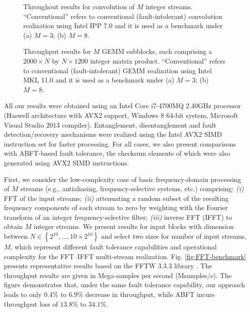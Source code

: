 \documentclass[twocolumn,english,onecolumn]{IEEEtran}
\theoremstyle{plain}
\theoremstyle{plain}
\begin{document}
\begin{figure*}[tbh]
\begin{centering}
\par\end{centering}

\protect\caption{Throughout results for convolution of $M$ integer streams. ``Conventional''
refers to conventional (fault-intolerant) convolution realization
using Intel IPP 7.0 and it is used as a benchmark under (a) $M=3$;
(b) $M=8$. \label{fig:CONV-benchmark}}
\end{figure*}


\begin{figure*}[tbh]
\begin{centering}
\par\end{centering}

\protect\caption{Throughput results for $M$ GEMM subblocks, each comprising a $2000\times N$
by $N\times1200$ integer matrix product. ``Conventional'' refers
to conventional (fault-intolerant) GEMM realization using Intel MKL
11.0 and it is used as a benchmark under (a) $M=3$; (b) $M=8$. \label{fig:GEMM-benchmark}}
\end{figure*}


All our results were obtained using an Intel Core i7-4700MQ 2.40GHz
processor (Haswell architecture with AVX2 support, Windows 8 64-bit
system, Microsoft Visual Studio 2013 compiler). Entanglement, disentanglement
and fault detection/recovery mechanisms were realized using the Intel
AVX2 SIMD instruction set for faster processing. For all cases, we
also present comparisons with ABFT-based fault tolerance, the checksum
elements of which were also generated using AVX2 SIMD instructions.

First, we consider the low-complexity case of basic frequency-domain
processing of $M$ streams (e.g., antialiasing, frequency-selective
systems, etc.) comprising: \emph{(i)} FFT of the input streams; \emph{(ii)}
attenuating a random subset of the resulting frequency components
of each stream to zero by weighting with the Fourier transform of
an integer frequency-selective filter; \emph{(iii)} inverse FFT (IFFT)
to obtain $M$ integer streams. We present results for input blocks
with dimension between $N\in\left\{ 2^{10},\ldots,10\times2^{10}\right\} $
and select two sizes for number of input streams, $M$, which represent
different fault tolerance capabilities and operational complexity
for the FFT--IFFT multi-stream realization. Fig. \ref{fig:FFT-benchmark}
presents representative results based on the FFTW 3.3.3 library \cite{frigo2012fftw}.
The throughput results are given in Mega-samples per second (Msamples/s).
The figure demonstrates that, under the same fault tolerance capability,
our approach leads to only $0.4\%$ to $6.9\%$ decrease in throughput,
while ABFT incurs throughput loss of $13.8\%$ to $34.1\%$.
\end{document}
